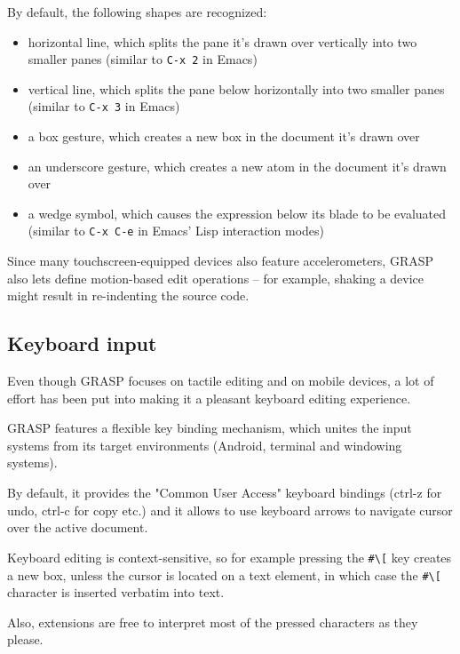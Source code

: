 \documentclass[sigconf]{acmart}
\begin{document}
By default, the following shapes are recognized:
\begin{itemize}
\item horizontal line, which splits the pane it's
drawn over vertically into two smaller panes
(similar to \texttt{C-x 2} in Emacs)

\item vertical line, which splits the pane below
horizontally into two smaller panes
(similar to \texttt{C-x 3} in Emacs)

\item a box gesture, which creates a new box in the
document it's drawn over

\item an underscore gesture, which creates a new atom
in the document it's drawn over

\item a wedge symbol, which causes the expression
below its blade to be evaluated (similar to
\texttt{C-x C-e} in Emacs' Lisp interaction modes)
\end{itemize}

Since many touchscreen-equipped devices also
feature accelerometers, GRASP also lets define
motion-based edit operations -- for example, shaking
a device might result in re-indenting the source
code.

\subsection{Keyboard input}

Even though GRASP focuses on tactile editing
and on mobile devices, a lot of effort has been
put into making it a pleasant keyboard editing
experience.

GRASP features a flexible key binding mechanism,
which unites the input systems from its target
environments (Android, terminal and windowing
systems).

By default, it provides the "Common User Access"
keyboard bindings (ctrl-z for undo, ctrl-c for copy
etc.) and it allows to use keyboard arrows to
navigate cursor over the active document.

Keyboard editing is context-sensitive, so
for example pressing the \texttt{\#\textbackslash[}
key creates a new box, unless the cursor is located on a text element,
in which case the \texttt{\#\textbackslash[} character is inserted verbatim
into text.

Also, extensions are free to interpret
most of the pressed characters as they please.
\end{document}
